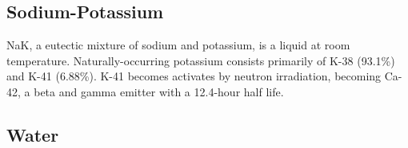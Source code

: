 \documentclass[10pt]{article}
\numberwithin{equation}{section} %
\begin{document}
\subsection{Sodium-Potassium}
NaK, a eutectic mixture of sodium and potassium, is a liquid at room temperature. Naturally-occurring potassium consists primarily of K-38 (93.1\%) and K-41 (6.88\%). K-41 becomes activates by neutron irradiation, becoming Ca-42, a beta and gamma emitter with a 12.4-hour half life. 

\subsection{Water}
\end{document}
